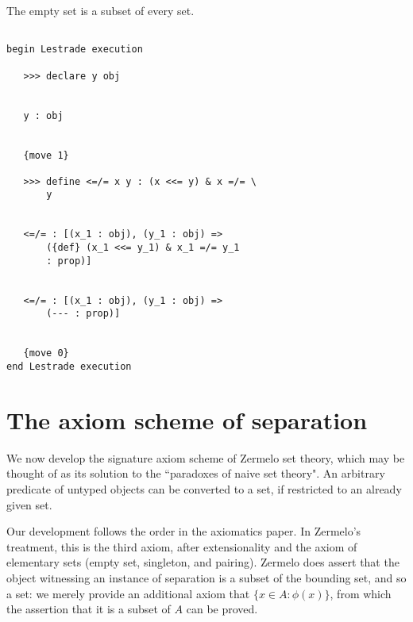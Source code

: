 \documentclass[12pt]{article}
\begin{document}
The empty set is a subset of every set.

\begin{verbatim}

begin Lestrade execution

   >>> declare y obj


   y : obj


   {move 1}

   >>> define <=/= x y : (x <<= y) & x =/= \
       y


   <=/= : [(x_1 : obj), (y_1 : obj) => 
       ({def} (x_1 <<= y_1) & x_1 =/= y_1 
       : prop)]


   <=/= : [(x_1 : obj), (y_1 : obj) => 
       (--- : prop)]


   {move 0}
end Lestrade execution
\end{verbatim}

\section{The axiom scheme of separation}

We now develop the signature axiom scheme of Zermelo set theory, which may be thought of as its solution to the ``paradoxes of naive set theory".  An arbitrary predicate of untyped objects can be converted to a set, if restricted to an already given set.

Our development follows the order in the axiomatics paper.  In Zermelo's treatment, this is the third axiom, after extensionality and the axiom of elementary sets
(empty set, singleton, and pairing).  Zermelo does assert that the object witnessing an instance of separation is a subset of the bounding set, and so a set:  we merely provide
an additional axiom that $\{x \in A : \phi(x)\}$, from which the assertion that it is a subset of $A$ can be proved.
\end{document}

